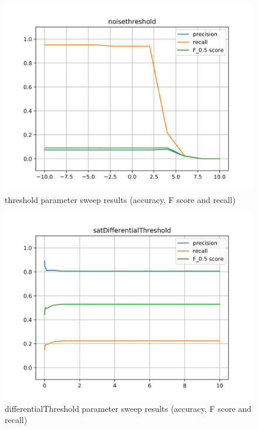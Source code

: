 \begin{figure}[!ht]
	\includegraphics[clip,width=\columnwidth]{Figures/noisethreshold.png}%
	\caption{threshold parameter sweep results (accuracy, F score and recall)}
	\label{fig:noisethreshold}
\end{figure}

\begin{figure}[!ht]
	\includegraphics[clip,width=\columnwidth]{Figures/satDifferentialThreshold.png}%
	\caption{differentialThreshold parameter sweep results (accuracy, F score and recall)}
	\label{fig:satDifferentialThreshold}
\end{figure}

